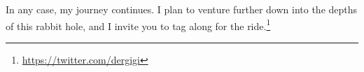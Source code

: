In any case, my journey continues. I plan to venture further down into the
depths of this rabbit hole, and I invite you to tag
along for the ride.\footnote{\url{https://twitter.com/dergigi}}

%
